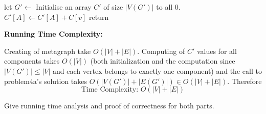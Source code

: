 \documentclass[answers]{exam}
\begin{document}
\begin{questions}
\begin{parts}
\begin{solution}











\begin{algorithmic}[1]
    \State let $G' \gets$ 
    \State Initialise an array $C'$ of size $|V(G')|$ to all $0$.
            \State $C'[A] \gets C'[A] + C[v]$
        \EndFor
    \EndFor
    \State return 
\EndFunction
\end{algorithmic}


\textbf{Running Time Complexity: }

Creating of metagraph take $O(|V| + |E|)$. Computing of $C'$ values for all components takes $O(|V|)$ (both initialization and the computation since $|V(G')| \le |V|$ and each vertex belongs to exactly one component) and the call to problem4a's solution takes $O(|V(G')| + |E(G')|) \in O(|V| + |E|)$. Therefore
\[
    \text{Time Complexity: } O (|V| + |E|)
\]

\end{solution}
\end{parts}
Give running time analysis and proof of correctness for both parts.












\end{questions}
\end{document}
